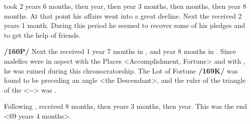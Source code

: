 \Aquarius\xspace took 2 years 6 months, then \Jupiter\xspace 1 year, then \Mars\xspace 1 year 3 months, then \Venus\xspace 8 months, then \Mercury\xspace 1 year 8 months. At that point his affairs went into a great decline. Next the \Moon\xspace received 2 years 1 month. During this period he seemed to recover some of his pledges and to get the help of friends. 

\textbf{/160P/} Next the \Sun\xspace received 1 year 7 months in \Leo, and \Mercury\xspace 1 year 8 months in \Virgo. Since malefics were in aspect with the Places <Accomplishment, Fortune> and with \Mercury, he was ruined during this chronocratorship. The Lot of Fortune \textbf{/169K/} was found to be preceding an angle <the Descendant>, and the ruler of the triangle of the \Moon\xspace <\Cancer-\Pisces-\Scorpio> was \Mars. 

Following \Mercury, \Venus\xspace received 8 months, then \Mars\xspace 1 years 3 months, then \Sagittarius\xspace 1 year. This was the end <69 years 4 months>.

\newpage
